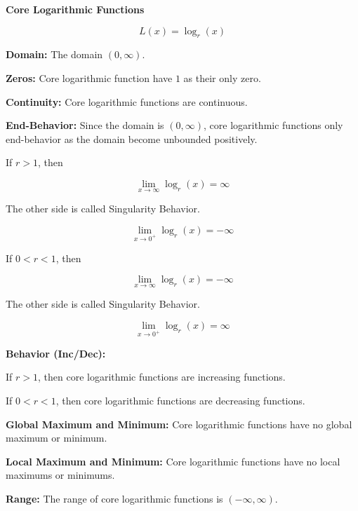 \documentclass{ximera}
\begin{document}
\begin{explanation} \textbf{\textcolor{red!75!green}{Core Logarithmic Functions}} 


\[ L(x) = \log_r(x)  \]



\textbf{Domain:} The domain $(0, \infty)$.

\textbf{Zeros:} Core logarithmic function have $1$ as their only zero.



\textbf{Continuity:} Core logarithmic functions are continuous.



\textbf{End-Behavior:} Since the domain is $(0, \infty)$, core logarithmic functions only end-behavior as the domain become unbounded positively.


If $r > 1$, then

\[
\lim\limits_{x \to \infty} \log_r(x) = \infty
\]


The other side is called Singularity Behavior.

\[
\lim\limits_{x \to 0^+} \log_r(x) = -\infty
\]





If $0 < r < 1$, then

\[
\lim\limits_{x \to \infty} \log_r(x) = -\infty
\]


The other side is called Singularity Behavior.

\[
\lim\limits_{x \to 0^+} \log_r(x) = \infty
\]







\textbf{Behavior (Inc/Dec):} 




If $r > 1$, then core logarithmic functions are increasing functions.


If $0 < r < 1$, then core logarithmic functions are decreasing functions.





\textbf{Global Maximum and Minimum:} Core logarithmic functions have no global maximum or minimum.

\textbf{Local Maximum and Minimum:}  Core logarithmic functions have no local maximums or minimums.

\textbf{Range:} The range of core logarithmic functions is $(-\infty,\infty)$.

\end{explanation}
\end{document}

